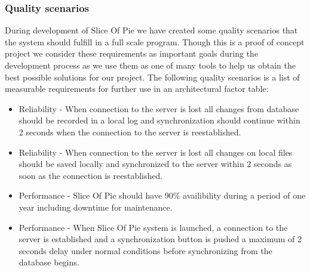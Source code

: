 \subsubsection{Quality scenarios}
During development of Slice Of Pie we have created some quality scenarios that the system should fulfill in a full scale program. Though this is a proof of concept project we consider these requirements as important goals during the development process as we use them as one of many tools to help us obtain the best possible solutions for our project.
The following quality scenarios is a list of measurable requirements for further use in an architectural factor table:
\begin{itemize}
\item Reliability -  When connection to the server is lost all changes from database should be recorded in a local log and synchronization should continue within 2 seconds when the connection to the server is reestablished.
\item Reliability - When connection to the server is lost all changes on local files should be saved locally and synchronized to the server within 2 seconds as soon as the connection is reestablished.
\item Performance - Slice Of Pie should have 90\% availibility during a period of one year including downtime for  maintenance.
\item Performance - When Slice Of Pie system is launched, a connection to the server is established and a synchronization button is pushed a maximum of 2 seconds delay under normal conditions before synchronizing from the database begins.
\end{itemize}